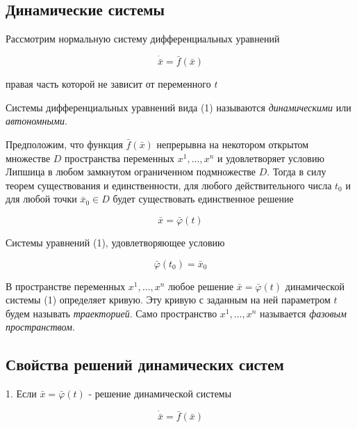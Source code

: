 \documentclass{article}
\theoremstyle{definition} \newtheorem*{theorem*}{Теорема}
\theoremstyle{plain} \newtheorem{theorem}{Теорема}[section]
\theoremstyle{definition} \newtheorem*{corollary*}{Следствие}
\theoremstyle{definition} \newtheorem{corollary}{Следствие}[section]
\begin{document}
\abovedisplayskip=0pt
\belowdisplayskip=9pt
\abovedisplayshortskip=0pt
\belowdisplayshortskip=12pt

\subsection*{Динамические системы}

Рассмотрим нормальную систему дифференциальных уравнений

\begin{equation}
    \dot{\bar{x}} = \bar{f}(\bar{x})
\end{equation}

правая часть которой не зависит от переменного $t$

Системы дифференциальных уравнений вида (1) называются
\textit{динамическими} или \textit{автономными}.

Предположим, что функция $\bar{f}(\bar{x})$ непрерывна на
некотором открытом множестве $D$ пространства переменных
$x^1, \dots, x^n$ и удовлетворяет условию Липшица в любом
замкнутом ограниченном подмножестве $D$. Тогда
в силу теорем существования и единственности, для любого
действительного числа $t_0$ и для любой точки $\bar{x}_0 \in D$
будет существовать единственное решение

\begin{equation*}
    \bar{x} = \bar{\varphi}(t)
\end{equation*}

Системы уравнений (1), удовлетворяющее условию

\begin{equation*}
    \bar{\varphi}(t_0) = \bar{x}_0
\end{equation*}

В пространстве переменных $x^1, \dots, x^n$ любое
решение $\bar{x} = \bar{\varphi}(t)$ динамической системы (1)
определяет кривую. Эту кривую с заданным на ней параметром
$t$ будем называть \textit{траекторией}.
Само пространство $x^1, \dots, x^n$ называется
\textit{фазовым пространством}.

\subsection*{Свойства решений динамических систем}

1. Если $ \bar{x} = \bar{\varphi}(t)$ -
решение динамической системы

\begin{equation}
    \dot{\bar{x}} = \bar{f}(\bar{x})
\end{equation}
\end{document}
